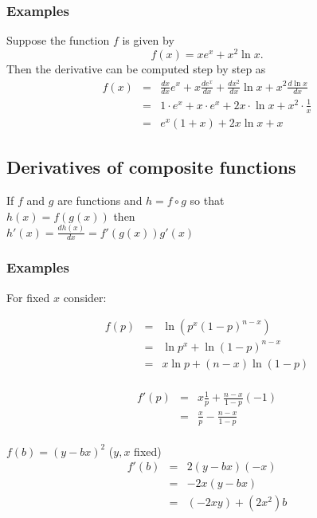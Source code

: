 \documentclass[12pt,a4paper]{article}
\theoremstyle{regla}
\theoremstyle{remark}
\theoremstyle{definition}
\theoremstyle{nonumberbreak}
\begin{document}
\subsubsection{Examples}
\begin{xmpl}
Suppose the function $f$ is given by
$$
f(x)=xe^x+x^2\ln x .
$$
Then the derivative can be computed step by step as
\begin{eqnarray*}
f(x)&=&\frac{dx}{dx}e^x+x\frac{de^x}{dx}+\frac{dx^2}{dx}\ln x +x^2\frac{d \ln x}{dx}\\
    &=&1\cdot e^x +     x \cdot e^x     + 2x \cdot \ln x     + x^2 \cdot \frac{1}{x}\\
    &=&e^x \left ( 1+x \right ) + 2x \ln  x +x
\end{eqnarray*}
\end{xmpl}


\subsection{Derivatives of composite functions}
\begin{fbox}
\begin{minipage}{0.97\textwidth}
If $f$ and $g$ are functions and $h=f  \circ g$ so that\\

$h(x) = f(g(x))$ then \\

$h'(x) = \frac{dh(x)}{dx} = f'(g(x)) g'(x)$
\end{minipage}
\end{fbox}
\subsubsection{Examples}
\begin{xmpl}
For fixed $x$ consider:
	
	\begin{eqnarray*}
	f(p) &=& \ln(p^{x} (1-p)^{n-x})\\
	     &=& \ln p^{x} + \ln(1-p)^{n-x}\\%
	     &=& x \ln p + (n-x) \ln (1-p)\\
	\end{eqnarray*}
	
	\begin{eqnarray*}
  f'(p)&=& x \frac{1}{p} + \frac{n-x}{1-p}(-1)\\
	     &=& \frac{x}{p} - \frac{n-x}{1-p}\\
	\end{eqnarray*}

\end{xmpl}
\begin{xmpl}	
	$f(b) = (y-bx)^2$ ($y,x$ fixed)\\
	
	\begin{eqnarray*}
	f'(b)&=& 2 (y-bx) (-x)\\
	     &=& -2x (y-bx)\\
	     &=&(-2xy) + (2x^2)b   
	\end{eqnarray*}
\end{xmpl}	
	
\end{document}
